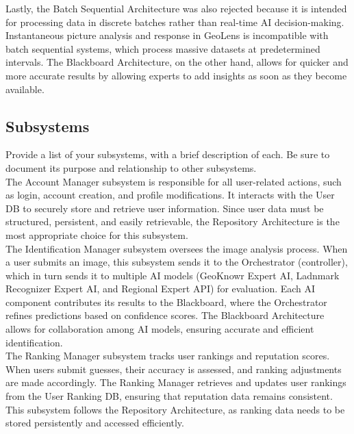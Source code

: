 \documentclass[]{article}
\begin{document}
\noindent Lastly, the Batch Sequential Architecture was also rejected because it is intended for processing data in discrete batches rather than real-time AI decision-making. Instantaneous picture analysis and response in GeoLens is incompatible with batch sequential systems, which process massive datasets at predetermined intervals. The Blackboard Architecture, on the other hand, allows for quicker and more accurate results by allowing experts to add insights as soon as they become available.\\


\subsection{Subsystems}
\label{sub:subsystems}
 \noindent Provide a list of your subsystems, with a brief description of each. Be sure to document its purpose and relationship to other subsystems.\\

 \noindent The Account Manager subsystem is responsible for all user-related actions, such as login, account creation, and profile modifications. It interacts with the User DB to securely store and retrieve user information. Since user data must be structured, persistent, and easily retrievable, the Repository Architecture is the most appropriate choice for this subsystem. \\

\noindent The Identification Manager subsystem oversees the image analysis process. When a user submits an image, this subsystem sends it to the Orchestrator (controller), which in turn sends it to multiple AI models (GeoKnowr Expert AI, Ladnmark Recognizer Expert AI, and Regional Expert API) for evaluation. Each AI component contributes its results to the Blackboard, where the Orchestrator refines predictions based on confidence scores. The Blackboard Architecture allows for collaboration among AI models, ensuring accurate and efficient identification. \\

\noindent The Ranking Manager subsystem tracks user rankings and reputation scores. When users submit guesses, their accuracy is assessed, and ranking adjustments are made accordingly. The Ranking Manager retrieves and updates user rankings from the User Ranking DB, ensuring that reputation data remains consistent. This subsystem follows the Repository Architecture, as ranking data needs to be stored persistently and accessed efficiently.
\end{document}
